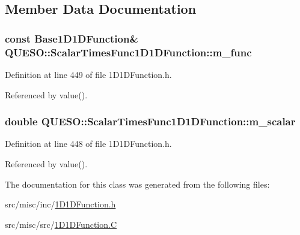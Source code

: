 \subsection{Member Data Documentation}
\hypertarget{class_q_u_e_s_o_1_1_scalar_times_func1_d1_d_function_a89766736ee9cdf03a6ead0fa5fe8bd83}{
\subsubsection[{m\-\_\-func}]{\setlength{\rightskip}{0pt plus 5cm}const {\bf Base1\-D1\-D\-Function}\& Q\-U\-E\-S\-O\-::\-Scalar\-Times\-Func1\-D1\-D\-Function\-::m\-\_\-func\hspace{0.3cm}{\ttfamily [protected]}}}\label{class_q_u_e_s_o_1_1_scalar_times_func1_d1_d_function_a89766736ee9cdf03a6ead0fa5fe8bd83}


Definition at line 449 of file 1\-D1\-D\-Function.\-h.



Referenced by value().

\hypertarget{class_q_u_e_s_o_1_1_scalar_times_func1_d1_d_function_a8e7e6ee4d186d901156d47c11231c81c}{
\subsubsection[{m\-\_\-scalar}]{\setlength{\rightskip}{0pt plus 5cm}double Q\-U\-E\-S\-O\-::\-Scalar\-Times\-Func1\-D1\-D\-Function\-::m\-\_\-scalar\hspace{0.3cm}{\ttfamily [protected]}}}\label{class_q_u_e_s_o_1_1_scalar_times_func1_d1_d_function_a8e7e6ee4d186d901156d47c11231c81c}


Definition at line 448 of file 1\-D1\-D\-Function.\-h.



Referenced by value().



The documentation for this class was generated from the following files\-:\begin{DoxyCompactItemize}
\item 
src/misc/inc/\hyperlink{1_d1_d_function_8h}{1\-D1\-D\-Function.\-h}\item 
src/misc/src/\hyperlink{1_d1_d_function_8_c}{1\-D1\-D\-Function.\-C}\end{DoxyCompactItemize}
